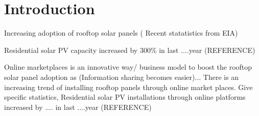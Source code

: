 \documentclass[mnsc,blindrev]{informs3} %
\begin{document}
%


\section{Introduction}

Increasing adoption of rooftop solar panels ( Recent statatistics from EIA)

Residential solar PV capacity increased by 300\%  in last ....year (REFERENCE)

Online marketplaces is an innovative way/ business model  to boost the rooftop solar panel adoption as (Information sharing becomes easier)...
There is an increasing trend of installing rooftop panels through online market places. Give specific statistics,  Residential solar PV installations through online platforms increased by ....  in last ....year (REFERENCE)
\end{document}
